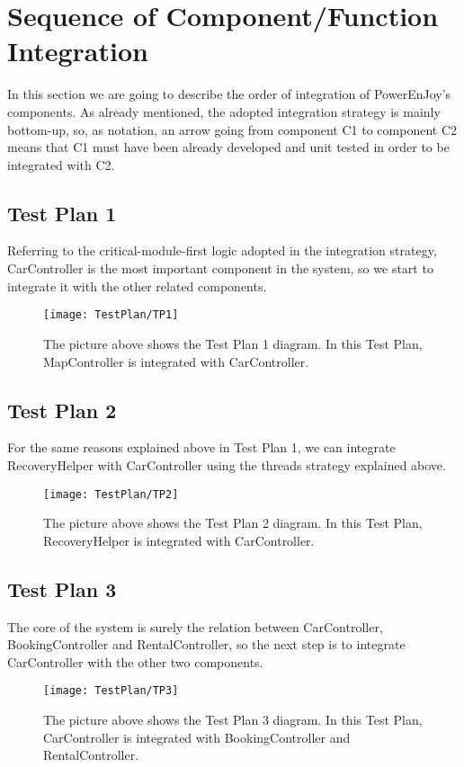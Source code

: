 
\section{Sequence of Component/Function Integration}
In this section we are going to describe the order of integration of PowerEnJoy's components. As already mentioned, the adopted integration strategy is mainly bottom-up, so, as notation, an arrow going from component C1 to component C2 means that C1 must have been already developed and unit tested in order to be integrated with C2.

\subsection{Test Plan 1}
Referring to the critical-module-first logic adopted in the integration strategy, CarController is the most important component in the system, so we start to integrate it with the other related components.
\begin{figure}[H]
	\centering
	\texttt{[image: TestPlan/TP1]}
	\caption[Test Plan 1 diagram]{The picture above shows the Test Plan 1 diagram. In this Test Plan, MapController is integrated with CarController.}
	\label{fig:TestPlan-1}
\end{figure}

\subsection{Test Plan 2}
For the same reasons explained above in Test Plan 1, we can integrate RecoveryHelper with CarController using the threads strategy explained above.
\begin{figure}[H]
	\centering
	\texttt{[image: TestPlan/TP2]}
	\caption[Test Plan 2 diagram]{The picture above shows the Test Plan 2 diagram. In this Test Plan, RecoveryHelper is integrated with CarController.}
	\label{fig:TestPlan-2}
\end{figure}

\subsection{Test Plan 3}
The core of the system is surely the relation between CarController, BookingController and RentalController, so the next step is to integrate CarController with the other two components.
\begin{figure}[H]
	\centering
	\texttt{[image: TestPlan/TP3]}
	\caption[Test Plan 3 diagram]{The picture above shows the Test Plan 3 diagram. In this Test Plan, CarController is integrated with BookingController and RentalController.}
	\label{fig:TestPlan-3}
\end{figure}

